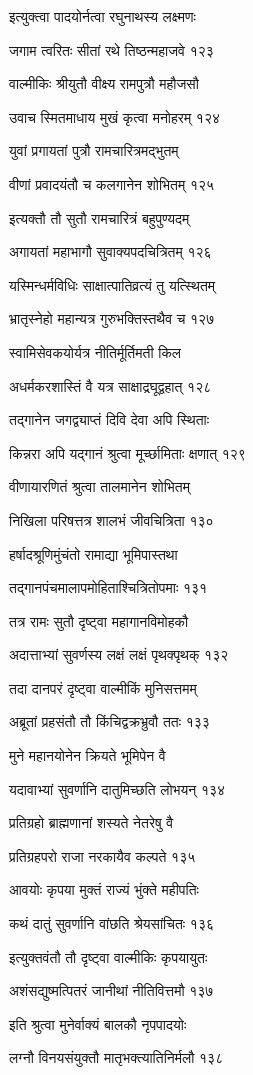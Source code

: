 इत्युक्त्वा पादयोर्नत्वा रघुनाथस्य लक्ष्मणः

जगाम त्वरितः सीतां रथे तिष्ठन्महाजवे १२३

वाल्मीकिः श्रीयुतौ वीक्ष्य रामपुत्रौ महौजसौ

उवाच स्मितमाधाय मुखं कृत्वा मनोहरम् १२४

युवां प्रगायतां पुत्रौ रामचारित्रमद्भुतम्

वीणां प्रवादयंतौ च कलगानेन शोभितम् १२५

इत्यक्तौ तौ सुतौ रामचारित्रं बहुपुण्यदम्

अगायतां महाभागौ सुवाक्यपदचित्रितम् १२६

यस्मिन्धर्मविधिः साक्षात्पातिव्रत्यं तु यत्स्थितम्

भ्रातृस्नेहो महान्यत्र गुरुभक्तिस्तथैव च १२७

स्वामिसेवकयोर्यत्र नीतिर्मूर्तिमती किल

अधर्मकरशास्तिं वै यत्र साक्षाद्रघूद्वहात् १२८

तद्गानेन जगद्व्याप्तं दिवि देवा अपि स्थिताः

किन्नरा अपि यद्गानं श्रुत्वा मूर्च्छामिताः क्षणात् १२९

वीणायारणितं श्रुत्वा तालमानेन शोभितम्

निखिला परिषत्तत्र शालभं जीवचित्रिता १३०

हर्षादश्रूणिमुंचंतो रामाद्या भूमिपास्तथा

तद्गानपंचमालापमोहिताश्चित्रितोपमाः १३१

तत्र रामः सुतौ दृष्ट्वा महागानविमोहकौ

अदात्ताभ्यां सुवर्णस्य लक्षं लक्षं पृथक्पृथक् १३२

तदा दानपरं दृष्ट्वा वाल्मीकिं मुनिसत्तमम्

अब्रूतां प्रहसंतौ तौ किंचिद्वक्रभ्रुवौ ततः १३३

मुने महानयोनेन क्रियते भूमिपेन वै

यदावाभ्यां सुवर्णानि दातुमिच्छति लोभयन् १३४

प्रतिग्रहो ब्राह्मणानां शस्यते नेतरेषु वै

प्रतिग्रहपरो राजा नरकायैव कल्पते १३५

आवयोः कृपया मुक्तं राज्यं भुंक्ते महीपतिः

कथं दातुं सुवर्णानि वांछति श्रेयसांचितः १३६

इत्युक्तवंतौ तौ दृष्ट्वा वाल्मीकिः कृपयायुतः

अशंसद्युष्मत्पितरं जानीथां नीतिवित्तमौ १३७

इति श्रुत्वा मुनेर्वाक्यं बालकौ नृपपादयोः

लग्नौ विनयसंयुक्तौ मातृभक्त्यातिनिर्मलौ १३८

